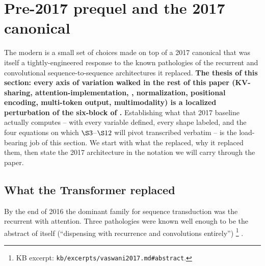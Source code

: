 
\section{Pre-2017 prequel and the 2017 canonical}
\label{sec:prequel-and-canonical}
\label{sec:transformer-overview}

The modern  is a small set of choices made on top of a
2017 canonical that was itself a tightly-engineered response to the
known pathologies of the recurrent and convolutional sequence-to-sequence
architectures it replaced. \textbf{The thesis of this section: every
axis of variation walked in the rest of this paper (KV-sharing,
attention-implementation, , normalization, positional encoding,
multi-token output, multimodality) is a localized perturbation of the
six-block  of \citet{vaswani2017}.} Establishing what
that 2017 baseline actually computes -- with every variable defined,
every shape labeled, and the four equations on which $\S 3$--$\S 12$
will pivot transcribed verbatim -- is the load-bearing job of this
section. We start with what the  replaced, why it
replaced them, then state the 2017 architecture in the notation we
will carry through the paper.

\subsection{What the Transformer replaced}
\label{sec:prequel}

By the end of 2016 the dominant family for sequence transduction was
the recurrent  with attention. Three pathologies were
known well enough to be the abstract of \citet{vaswani2017} itself
(``dispensing with recurrence and convolutions
entirely'')%
\footnote{KB excerpt: \texttt{kb/excerpts/vaswani2017.md\#abstract}.}
\citep[abstract]{vaswani2017}.

